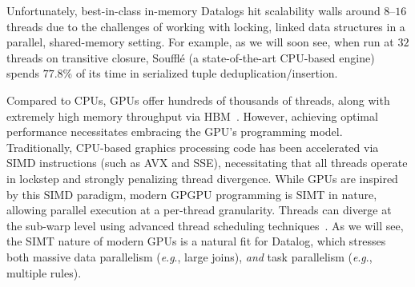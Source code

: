 \documentclass[nonacm,sigplan]{acmart}
\newcommand{\tool}{\textsc{GPUlog}}
\newcommand{\yihao}[1]{{#1}}
\begin{document}
Unfortunately, best-in-class in-memory Datalogs hit scalability walls around $8$--$16$ threads due to the challenges of working with locking, linked data structures in a parallel, shared-memory setting. For example, as we will soon see, when run at $32$ threads on transitive closure, Souffl\'e \cite{jordan2016souffle} (a state-of-the-art CPU-based engine) spends $77.8$\% of its time in serialized tuple deduplication/insertion. 

Compared to CPUs, GPUs offer hundreds of thousands of threads, along with extremely high memory throughput via HBM~\cite{hbm}. However, achieving optimal performance necessitates embracing the GPU's programming model. Traditionally, CPU-based graphics processing code has been accelerated via SIMD instructions (such as AVX and SSE), necessitating that all threads operate in lockstep and strongly penalizing thread divergence. While GPUs are inspired by this SIMD paradigm, modern GPGPU programming is SIMT in nature, allowing parallel execution at a per-thread granularity. Threads can diverge at the sub-warp level using advanced thread scheduling techniques~\cite{simt}.
As we will see, the SIMT nature of modern GPUs is a natural fit for Datalog, which stresses both massive data parallelism (\emph{e}.\emph{g}., large joins), \emph{and} task parallelism (\emph{e}.\emph{g}., multiple rules).


\end{document}
